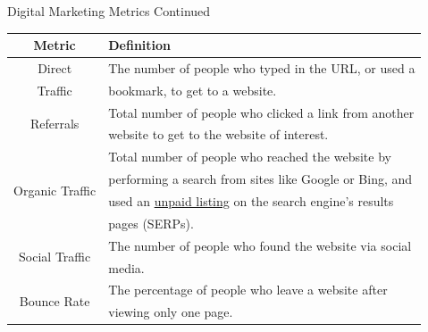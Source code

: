 \documentclass[pdf]{beamer}
\theoremstyle{remark}
\theoremstyle{definition}
\begin{document}
\begin{frame}[t]{Digital Marketing Metrics Continued}
\footnotesize
\begin{table}[htbp]
  \centering
  \captionsetup{justification=centering}
    \begin{tabular}{|c|l|}
    \toprule
    Metric & Definition \\
    \midrule
  Direct  & The number of people who typed in the URL, or used a \\
  Traffic &  bookmark, to get to a website.\\
  \midrule 
   \multirow{2}{*}{Referrals} & Total number of people who clicked a link from another \\
    & website to get to the website of interest.\\
   \midrule 
    \multirow{4}{*}{Organic Traffic} & Total number of people who reached the website by \\
                  & performing a search from sites like Google or Bing, and \\
                  & used an \underline{unpaid listing} on the search engine's results\\
                  & pages (SERPs). \\
    \midrule
    \multirow{2}{*}{Social Traffic} & The number of people who found the website via social \\
                  & media. \\
    \midrule 
    \multirow{2}{*}{Bounce Rate} & The percentage of people who leave a website after \\
              & viewing only one page. \\ 

    \bottomrule
     \end{tabular}%
  \label{tab:custmetrics}%
\end{table}%
\end{frame}
\end{document}
